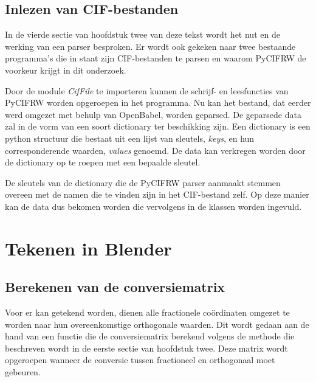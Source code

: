 \subsection{Inlezen van CIF-bestanden}
In de vierde sectie van hoofdstuk twee van deze tekst wordt het nut en de werking van een parser besproken. Er wordt ook gekeken naar twee bestaande programma's die in staat zijn CIF-bestanden te parsen en waarom PyCIFRW de voorkeur krijgt in dit onderzoek.
\par
Door de module \textit{CifFile} te importeren kunnen de schrijf- en leesfuncties van PyCIFRW worden opgeroepen in het programma. Nu kan het bestand, dat eerder werd omgezet met behulp van OpenBabel, worden geparsed. De geparsede data zal in de vorm van een soort dictionary ter beschikking zijn. Een dictionary is een python structuur die bestaat uit een lijst van sleutels, \textit{keys}, en hun corresponderende waarden, \textit{values} genoemd. De data kan verkregen worden door de dictionary op te roepen met een bepaalde sleutel.
\par
De sleutels van de dictionary die de PyCIFRW parser aanmaakt stemmen overeen met de namen die te vinden zijn in het CIF-bestand zelf. Op deze manier kan de data dus bekomen worden die vervolgens in de klassen worden ingevuld.

\section{Tekenen in Blender}
\subsection{Berekenen van de conversiematrix}
Voor er kan getekend worden, dienen alle fractionele coördinaten omgezet te worden  naar hun overeenkomstige orthogonale waarden. Dit wordt gedaan aan de hand van een functie die de conversiematrix berekend volgens de methode die beschreven wordt in de eerste sectie van hoofdstuk twee. Deze matrix wordt opgeroepen wanneer de conversie tussen fractioneel en orthogonaal moet gebeuren.

